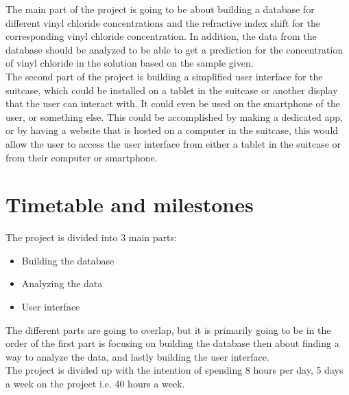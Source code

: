 \documentclass{article}
\begin{document}
The main part of the project is going to be about building a database for different vinyl chloride concentrations and the refractive index shift for the corresponding vinyl chloride concentration.
In addition, the data from the database should be analyzed to be able to get a prediction for the concentration of vinyl chloride in the solution based on the sample given.\\

The second part of the project is building a simplified user interface for the suitcase, which could be installed on a tablet in the suitcase or another display that the user can interact with.
It could even be used on the smartphone of the user, or something else.
This could be accomplished by making a dedicated app, or by having a website that is hosted on a computer in the suitcase, this would allow the user to access the user interface from either a tablet in the suitcase or from their computer or smartphone.\\

\vspace{15mm}
\section*{Timetable and milestones}
The project is divided into 3 main parts:\\
\begin{itemize}
    \item Building the database
    \item Analyzing the data
    \item User interface
\end{itemize}

The different parts are going to overlap, but it is primarily going to be in the order of the first part is focusing on building the database then about finding a way to analyze the data, and lastly building the user interface.\\
The project is divided up with the intention of spending 8 hours per day, 5 days a week on the project i.e. 40 hours a week.
\end{document}
